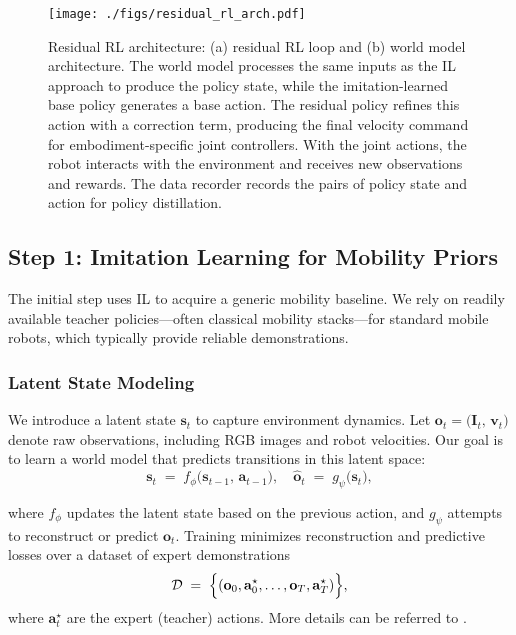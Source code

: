 \documentclass[letterpaper, 10 pt,conference]{ieeeconf}
\begin{document}
\begin{figure*}[ht]
    \centering
    \texttt{[image: ./figs/residual\_rl\_arch.pdf]}
    \caption{Residual RL architecture: (a) residual RL loop and (b) world model architecture. The world model processes the same inputs as the IL approach to produce the policy state, while the imitation-learned base policy generates a base action. The residual policy refines this action with a correction term, producing the final velocity command for embodiment-specific joint controllers. With the joint actions, the robot interacts with the environment and receives new observations and rewards. The data recorder records the pairs of policy state and action for policy distillation.}
    \label{fig:residual_rl_arch}
\end{figure*}

\subsection{Step 1: Imitation Learning for Mobility Priors}
\label{sec:il}

The initial step uses IL to acquire a generic mobility baseline. We rely on readily available teacher policies—often classical mobility stacks—for standard mobile robots, which typically provide reliable demonstrations.

\subsubsection{Latent State Modeling}
We introduce a latent state $\mathbf{s}_t$ to capture environment dynamics. Let $\mathbf{o}_t=\bigl(\mathbf{I}_t,\, \mathbf{v}_t\bigl)$ denote raw observations, including RGB images and robot velocities. Our goal is to learn a world model that predicts transitions in this latent space:
\[
    \mathbf{s}_{t} \;=\; f_{\phi}\bigl(\mathbf{s}_{t-1},\, \mathbf{a}_{t-1}\bigr),
    \quad
    \widehat{\mathbf{o}}_{t} \;=\; g_{\psi}\bigl(\mathbf{s}_t\bigr),
\]

where $f_\phi$ updates the latent state based on the previous action, and $g_\psi$ attempts to reconstruct or predict $\mathbf{o}_t$. Training minimizes reconstruction and predictive losses over a dataset of expert demonstrations
\[
    \mathcal{D} \;=\; \Bigl\{(\mathbf{o}_{0}, \mathbf{a}_{0}^{\star}, \ldots, \mathbf{o}_{T}, \mathbf{a}_{T}^{\star})\Bigr\},
\]
where $\mathbf{a}_t^{\star}$ are the expert (teacher) actions. More details can be referred to \cite{liu2024x}.
\end{document}
